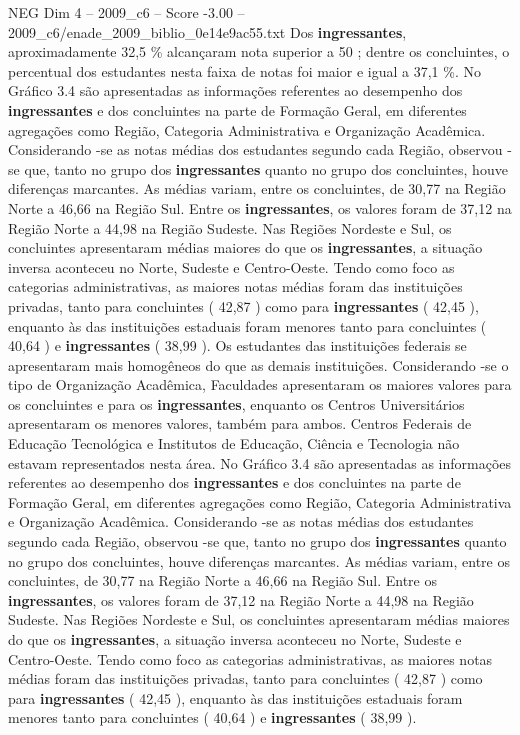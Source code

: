\begin{textsample}{NEG Dim 4 – 2009\_c6 – Score -3.00 – 2009\_c6/enade\_2009\_biblio\_0e14e9ac55.txt}
Dos \textbf{ingressantes}, aproximadamente 32,5 \% alcançaram nota superior a 50 ; dentre os concluintes, o percentual dos estudantes nesta faixa de notas foi maior e igual a 37,1 \%.
No Gráfico 3.4 são apresentadas as informações referentes ao desempenho dos \textbf{ingressantes} e dos concluintes na parte de Formação Geral, em diferentes agregações como Região, Categoria Administrativa e Organização Acadêmica.
Considerando -se as notas médias dos estudantes segundo cada Região, observou -se que, tanto no grupo dos \textbf{ingressantes} quanto no grupo dos concluintes, houve diferenças marcantes.
As médias variam, entre os concluintes, de 30,77 na Região Norte a 46,66 na Região Sul.
Entre os \textbf{ingressantes}, os valores foram de 37,12 na Região Norte a 44,98 na Região Sudeste.
Nas Regiões Nordeste e Sul, os concluintes apresentaram médias maiores do que os \textbf{ingressantes}, a situação inversa aconteceu no Norte, Sudeste e Centro-Oeste.
Tendo como foco as categorias administrativas, as maiores notas médias foram das instituições privadas, tanto para concluintes ( 42,87 ) como para \textbf{ingressantes} ( 42,45 ), enquanto às das instituições estaduais foram menores tanto para concluintes ( 40,64 ) e \textbf{ingressantes} ( 38,99 ).
Os estudantes das instituições federais se apresentaram mais homogêneos do que as demais instituições.
Considerando -se o tipo de Organização Acadêmica, Faculdades apresentaram os maiores valores para os concluintes e para os \textbf{ingressantes}, enquanto os Centros Universitários apresentaram os menores valores, também para ambos.
Centros Federais de Educação Tecnológica e Institutos de Educação, Ciência e Tecnologia não estavam representados nesta área.
No Gráfico 3.4 são apresentadas as informações referentes ao desempenho dos \textbf{ingressantes} e dos concluintes na parte de Formação Geral, em diferentes agregações como Região, Categoria Administrativa e Organização Acadêmica.
Considerando -se as notas médias dos estudantes segundo cada Região, observou -se que, tanto no grupo dos \textbf{ingressantes} quanto no grupo dos concluintes, houve diferenças marcantes.
As médias variam, entre os concluintes, de 30,77 na Região Norte a 46,66 na Região Sul.
Entre os \textbf{ingressantes}, os valores foram de 37,12 na Região Norte a 44,98 na Região Sudeste.
Nas Regiões Nordeste e Sul, os concluintes apresentaram médias maiores do que os \textbf{ingressantes}, a situação inversa aconteceu no Norte, Sudeste e Centro-Oeste.
Tendo como foco as categorias administrativas, as maiores notas médias foram das instituições privadas, tanto para concluintes ( 42,87 ) como para \textbf{ingressantes} ( 42,45 ), enquanto às das instituições estaduais foram menores tanto para concluintes ( 40,64 ) e \textbf{ingressantes} ( 38,99 ).

\end{textsample}
